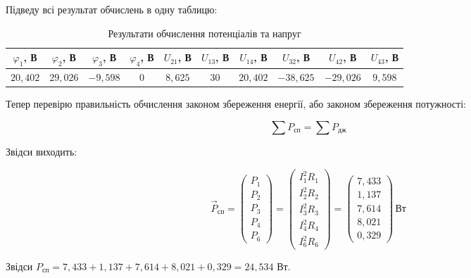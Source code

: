 \documentclass[12pt,a4paper]{article}
\begin{document}
    \setlength{\parindent}{0em}

    Підведу всі результат обчислень в одну таблицю:

    \begin{table}[h!]
        \centering
        \begin{tabular}{|c|c|c|c|c|c|c|c|c|c|}
            \hline
            $\varphi_1$, В & $\varphi_2$, В & $\varphi_3$, В & $\varphi_4$, В & $U_{21}$, В & $U_{13}$, В & $U_{14}$, В & $U_{32}$, В & $U_{42}$, В & $U_{43}$, В \\
            \hline
            $20{,}402$ & $29{,}026$ & $-9{,}598$ & $0$ & $8{,}625$ & $30$ & $20{,}402$ & $-38{,}625$ & $-29{,}026$ & $9{,}598$\\
            \hline
        \end{tabular}
        \caption{Результати обчислення потенціалів та напруг}
    \end{table}
    
    \newpage
    \setlength{\parindent}{1.5em}

    Тепер перевірю правильність обчислення законом збереження енергії, або законом збереження потужності:

    \[\sum P_{\text{сп}} = \sum P_{\text{дж}}\]

    Звідси виходить:

    \[
    \vec{P}_{\text{сп}} =
    \begin{pmatrix}
    P_{1}\\
    P_{2}\\
    P_{3}\\
    P_{4}\\
    P_{6}
    \end{pmatrix}
    =
    \begin{pmatrix}
    I_{1}^{2} R_{1}\\
    I_{2}^{2} R_{2}\\
    I_{3}^{2} R_{3}\\
    I_{4}^{2} R_{4}\\
    I_{6}^{2} R_{6}
    \end{pmatrix}
    =
    \begin{pmatrix}
    7{,}433\\
    1{,}137\\
    7{,}614\\
    8{,}021\\
    0{,}329
    \end{pmatrix}\,\text{Вт}
    \]

    Звідси $P_{\text{сп}} = 7{,}433 + 1{,}137 + 7{,}614 + 8{,}021 + 0{,}329 = 24{,}534$ Вт.
\end{document}

